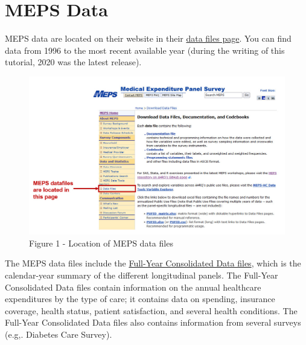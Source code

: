 \documentclass[
]{book}
\theoremstyle{definition}
\theoremstyle{definition}
\theoremstyle{definition}
\theoremstyle{definition}
\theoremstyle{remark}
\begin{document}
\hypertarget{meps-data}{%
\section{MEPS Data}\label{meps-data}}

MEPS data are located on their website in their \href{https://www.meps.ahrq.gov/mepsweb/data_stats/download_data_files.jsp}{data files page}. You can find data from 1996 to the most recent available year (during the writing of this tutorial, 2020 was the latest release).

\begin{figure}
\includegraphics[width=1\linewidth]{Figure 1} \caption{Figure 1 - Location of MEPS data files}\label{fig:unnamed-chunk-2}
\end{figure}

The MEPS data files include the \href{https://www.meps.ahrq.gov/mepsweb/data_stats/download_data_files_detail.jsp?cboPufNumber=HC-224}{Full-Year Consolidated Data files}, which is the calendar-year summary of the different longitudinal panels. The Full-Year Consolidated Data files contain information on the annual healthcare expenditures by the type of care; it contains data on spending, insurance coverage, health status, patient satisfaction, and several health conditions. The Full-Year Consolidated Data files also contains information from several surveys (e.g,. Diabetes Care Survey).
\end{document}
